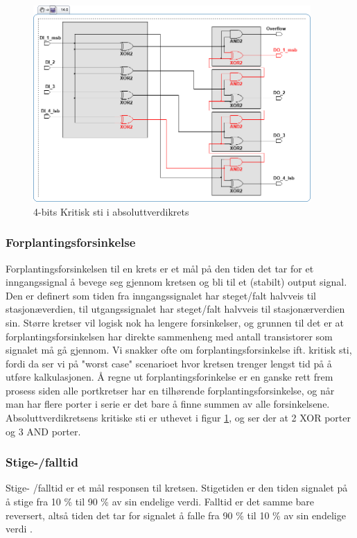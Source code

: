 \documentclass[11pt, a4paper, norwegian]{article}
\begin{document}
\begin{figure}[h]
  \caption{4-bits Kritisk sti i absoluttverdikrets}
  \label{fig_kritisk}
  \centerline{\includegraphics[width=300pt]{kritisk_sti.png}}
\end{figure}

\subsubsection{Forplantingsforsinkelse}
Forplantingsforsinkelsen til en krets er et mål på den tiden det tar for et inngangssignal å bevege seg gjennom kretsen og bli til et (stabilt) output signal. Den er definert som tiden fra inngangssignalet har steget/falt halvveis til stasjonæverdien, til utgangssignalet har steget/falt halvveis til stasjonærverdien sin. Større kretser vil logisk nok ha lengere forsinkelser, og grunnen til det er at forplantingsforsinkelsen har direkte sammenheng med antall transistorer som signalet må gå gjennom. Vi snakker ofte om forplantingsforsinkelse ift. kritisk sti, fordi da ser vi på "worst case" scenarioet hvor kretsen trenger lengst tid på å utføre kalkulasjonen. 
Å regne ut forplantingsforinkelse er en ganske rett frem prosess siden alle portkretser har en tilhørende forplantingsforsinkelse, og når man har flere porter i serie er det bare å finne summen av alle forsinkelsene. 
Absoluttverdikretsens kritiske sti er uthevet i figur \ref{fig_kritisk}, og ser der at 2 XOR porter og 3 AND porter. 

\subsubsection{Stige-/falltid}
Stige- /falltid er et mål responsen til kretsen. Stigetiden er den tiden signalet på å stige fra 10 \% til 90 \% av sin endelige verdi. Falltid er det samme bare reversert, altså tiden det tar for signalet å falle fra 90 \% til 10 \% av sin endelige verdi \cite{digtekbok}. 
\end{document}

